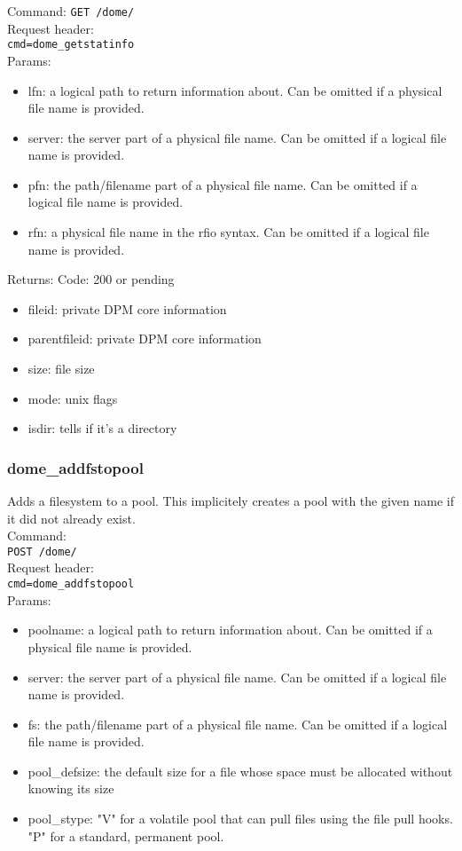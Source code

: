 \documentclass[a4paper,10pt]{scrreprt}
\begin{document}
Command:
\lstinline"GET /dome/"\\
Request header:\\
\lstinline"cmd=dome_getstatinfo"\\
Params:
\begin{itemize}
 \item lfn: a logical path to return information about. Can be omitted if a physical file name is provided.
 \item server: the server part of a physical file name. Can be omitted if a logical file name is provided.
 \item pfn: the path/filename part of a physical file name. Can be omitted if a logical file name is provided.
 \item rfn: a physical file name in the rfio syntax. Can be omitted if a logical file name is provided.
\end{itemize}

Returns:
Code: 200 or pending
\begin{itemize}
 \item fileid: private DPM core information
 \item parentfileid: private DPM core information
 \item size: file size
 \item mode: unix flags
 \item isdir: tells if it's a directory
\end{itemize}

\subsubsection{dome\_addfstopool}
Adds a filesystem to a pool. This implicitely creates a pool with the given name if it did not already exist.\\

Command:\\
\lstinline"POST /dome/"\\
Request header:\\
\lstinline"cmd=dome_addfstopool"\\
Params:
\begin{itemize}
 \item poolname: a logical path to return information about. Can be omitted if a physical file name is provided.
 \item server: the server part of a physical file name. Can be omitted if a logical file name is provided.
 \item fs: the path/filename part of a physical file name. Can be omitted if a logical file name is provided.
 \item pool_defsize: the default size for a file whose space must be allocated without knowing its size
 \item pool_stype: "V" for a volatile pool that can pull files using the file pull hooks. "P" for a standard, permanent pool.
\end{itemize}
\end{document}
